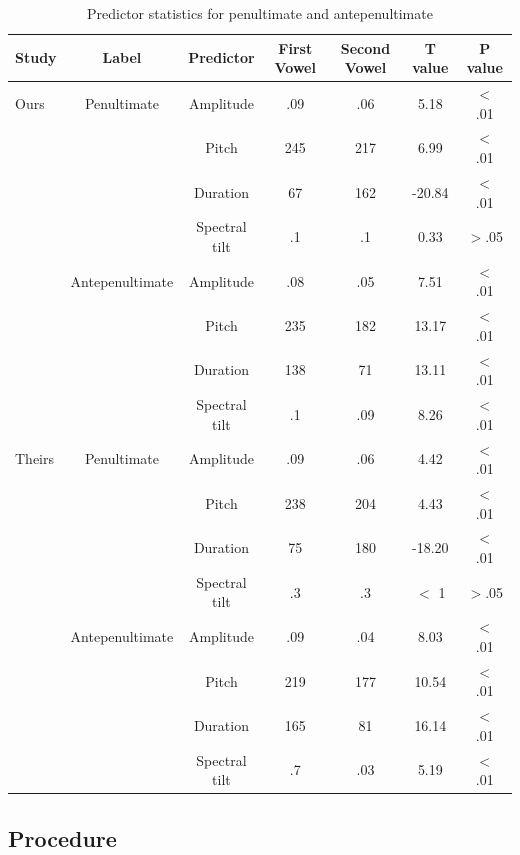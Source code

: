 \begin{table}[ht]
\centering
\caption{Predictor statistics for penultimate and antepenultimate}
\begin{tabular*}{\textwidth}{@{\extracolsep{\fill}} lcccccc}
\hline
\textbf{Study} & \textbf{Label} & \textbf{Predictor} & \textbf{First Vowel} & \textbf{Second Vowel} &\textbf{T value} & \textbf{P value}\\
\hline
Ours & Penultimate & Amplitude       & .09 & .06 & 5.18  & $<$ .01\\
     &           & Pitch           & 245 & 217 & 6.99  & $<$ .01\\
     &             & Duration        & 67 & 162 & -20.84 & $<$ .01\\
     &             & Spectral tilt   & .1 & .1 & 0.33  & $>$.05 \\
 & Antepenultimate & Amplitude       & .08 & .05 & 7.51  & $<$ .01\\
     &             & Pitch           & 235 & 182 & 13.17 & $<$ .01\\
     &             & Duration        & 138 & 71 & 13.11 & $<$ .01\\
     &             & Spectral tilt   & .1 & .09 & 8.26  & $<$ .01\\
\hline
Theirs&Penultimate & Amplitude     & .09 & .06   & 4.42 & $<$ .01\\
       &           & Pitch         & 238  & 204 & 4.43 & $<$ .01\\
       &           & Duration      & 75 & 180   & -18.20 & $<$ .01\\
       &           & Spectral tilt &.3 & .3 & $<$ 1  & $>$.05\\
& Antepenultimate  & Amplitude     & .09  & .04 & 8.03  & $<$ .01\\
       &           & Pitch         &  219 & 177 & 10.54  & $<$ .01\\
       &           & Duration      & 165  & 81  & 16.14  & $<$ .01\\
       &           & Spectral tilt &  .7  & .03  & 5.19  & $<$ .01\\
\hline
\end{tabular*}
\label{tab:acoustics}
\end{table}

\subsection{Procedure}

